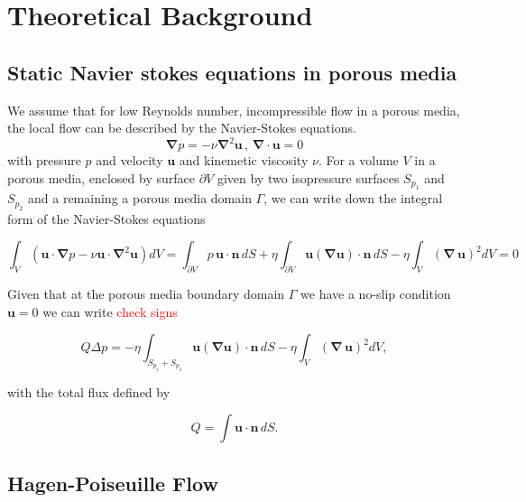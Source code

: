 \documentclass[draft]{agujournal2019}
\newcommand{\markred}[1]{\textcolor{red}{#1}}
\begin{document}
\section{Theoretical Background}
\subsection{Static Navier stokes equations in porous media}
We assume that for low Reynolds number, incompressible flow in a porous media, the local flow can be described by the Navier-Stokes equations. 
\begin{equation}\label{eq:stokes_local}
	\mathbf{\nabla} p = - \nu\mathbf{\nabla}^2 \mathbf{u}\,,\,\mathbf{\nabla}\cdot\mathbf{u}=0
	\end{equation}
with pressure $p$ and velocity $\mathbf{u}$ and kinemetic viscosity $\nu$. 
For a volume $V$ in a porous media, enclosed by surface $\partial V$ given by two isopressure surfaces $S_{p_1}$ and $S_{p_2}$ and a remaining a porous media domain $\Gamma$, we can write down the integral form of the Navier-Stokes equations


\begin{equation}\label{eq:stokes_dissipation}
\int_V \left(\mathbf{u}\cdot\mathbf{\nabla} p-\nu \mathbf{u}\cdot\mathbf{\nabla}^2 \mathbf{u}\right) dV 
= \int_{\partial V}  p\,\mathbf{u}\cdot\mathbf{n}\,dS+\eta \int_{\partial V} \mathbf{u} (\mathbf{\nabla} \mathbf{u})\cdot\mathbf{n}\,dS-\eta \int_{V} (\mathbf{\nabla}\, \mathbf{u})^2 dV=0
\end{equation}

Given that at the porous media boundary domain $\Gamma$ we have a no-slip condition $\mathbf{u}=0$ we can write \markred{check signs}

\begin{equation}\label{eq:pressuredrop}
	Q \Delta p = -\eta\int_{S_{p_1}+S_{p_2}} \mathbf{u} (\mathbf{\nabla} \mathbf{u})\cdot\mathbf{n}\,dS -\eta \int_V (\mathbf{\nabla}\, \mathbf{u})^2 dV,
\end{equation}


with the total flux defined by 

\begin{equation}
	Q=\int \mathbf{u}\cdot\mathbf{n}\, dS.
\end{equation}




\subsection{Hagen-Poiseuille Flow} 
\end{document}
